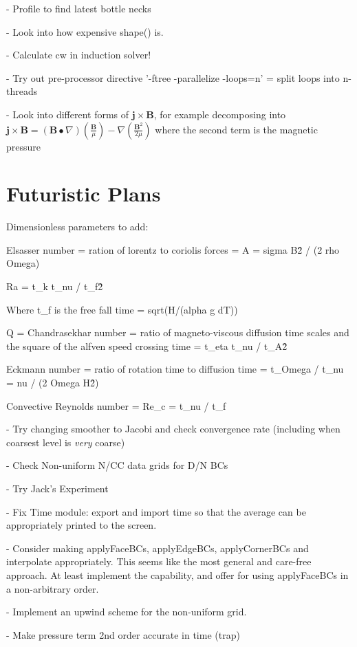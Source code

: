 \documentclass[11pt]{article}
\begin{document}
- Profile to find latest bottle necks

- Look into how expensive shape() is.

- Calculate cw in induction solver!

- Try out pre-processor directive '-ftree -parallelize -loops=n' = split loops into n-threads

- Look into different forms of $\mathbf{j}\times \mathbf{B}$, for example 
decomposing into $\mathbf{j}\times \mathbf{B} = (\mathbf{B}\bullet\nabla) \left(\frac{\mathbf{B}}{\mu}\right) - \nabla \left( \frac{\mathbf{B}^2}{2\mu} \right)$ where the second term is the magnetic pressure

\section{Futuristic Plans}

Dimensionless parameters to add:

Elsasser number = ration of lorentz to coriolis forces = A = sigma B\^2 / (2 rho Omega)

Ra = t\_k t\_nu / t\_f\^2

Where t\_f is the free fall time = sqrt(H/(alpha g dT))

Q = Chandrasekhar number = ratio of magneto-viscous diffusion time scales and the square of the alfven speed crossing time
 = t\_eta t\_nu / t\_A\^2

Eckmann number = ratio of rotation time to diffusion time
 = t\_Omega / t\_nu = nu / (2 Omega H\^2)


Convective Reynolds number = Re\_c = t\_nu / t\_f

- Try changing smoother to Jacobi and check convergence rate (including when coarsest level is \textit{very} coarse)

- Check Non-uniform N/CC data grids for D/N BCs

- Try Jack's Experiment

- Fix Time module: export and import time so that the average can be appropriately
printed to the screen.

- Consider making applyFaceBCs, applyEdgeBCs, applyCornerBCs and interpolate appropriately. This seems like the most general and care-free approach. At least implement the capability, and offer for using applyFaceBCs in a non-arbitrary order.

- Implement an upwind scheme for the non-uniform grid.

- Make pressure term 2nd order accurate in time (trap)
\end{document}
